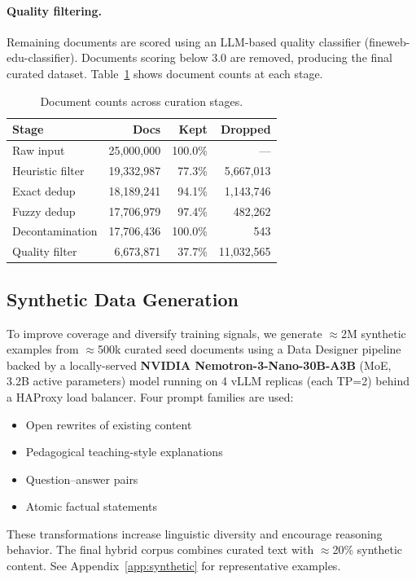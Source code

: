 \documentclass[10pt]{article}
\begin{document}
\paragraph{Quality filtering.}
Remaining documents are scored using an LLM-based quality classifier (fineweb-edu-classifier). Documents scoring below 3.0 are removed, producing the final curated dataset.
Table~\ref{tab:curation-stages} shows document counts at each stage.

\begin{table}[H]
\centering
\small
\caption{Document counts across curation stages.}
\label{tab:curation-stages}
\begin{tabular}{lrrr}
\toprule
\textbf{Stage} & \textbf{Docs} & \textbf{Kept} & \textbf{Dropped} \\
\midrule
Raw input        & 25,000,000 & 100.0\% & --- \\
Heuristic filter & 19,332,987 & 77.3\%  & 5,667,013 \\
Exact dedup      & 18,189,241 & 94.1\%  & 1,143,746 \\
Fuzzy dedup      & 17,706,979 & 97.4\%  & 482,262 \\
Decontamination  & 17,706,436 & 100.0\% & 543 \\
Quality filter   & 6,673,871  & 37.7\%  & 11,032,565 \\
\bottomrule
\end{tabular}
\end{table}

\subsection{Synthetic Data Generation}

To improve coverage and diversify training signals, we generate
${\approx}$2M synthetic examples from ${\approx}$500k curated seed documents using a Data Designer pipeline backed by a locally-served
\textbf{NVIDIA Nemotron-3-Nano-30B-A3B} (MoE, 3.2B active parameters) model running on 4 vLLM replicas (each TP=2) behind a HAProxy load balancer.
Four prompt families are used:
\begin{itemize}
\item Open rewrites of existing content
\item Pedagogical teaching-style explanations
\item Question--answer pairs
\item Atomic factual statements
\end{itemize}
These transformations increase linguistic diversity and encourage reasoning behavior.
The final hybrid corpus combines curated text with ${\approx}$20\% synthetic content.
See Appendix~\ref{app:synthetic} for representative examples.
\end{document}
